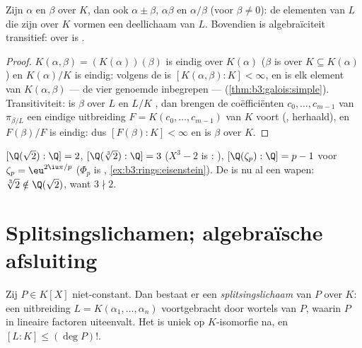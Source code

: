 \begin{corollary}\label{cor:b3:galois:algclosed}
Zijn $\alpha$ en $\beta$  over $K$, dan ook $\alpha \pm
\beta$, $\alpha\beta$ en $\alpha/\beta$ (voor $\beta \ne 0$): de
elementen van $L$ die  zijn over $K$ vormen een
deellichaam van $L$. Bovendien is algebraïciteit transitief:
 over  is .
\end{corollary}

\begin{proof}
$K(\alpha, \beta) = (K(\alpha))(\beta)$ is eindig over
$K(\alpha)$ ($\beta$ is  over $K \subseteq K(\alpha)$)
en $K(\alpha)/K$ is eindig: volgens de  is
$[K(\alpha,\beta):K] < \infty$, en is elk element van $K(\alpha,
\beta)$ --- de vier genoemde inbegrepen --- 
(\cref{thm:b3:galois:simple}). Transitiviteit: is $\beta$
 over $L$ en $L/K$ , dan brengen de
coëfficiënten $c_0, \dots, c_{m-1}$ van $\pi_{\beta/L}$ een
eindige uitbreiding $F = K(c_0, \dots, c_{m-1})$ van $K$ voort
(, herhaald), en $F(\beta)/F$ is eindig: dus
$[F(\beta):K] < \infty$ en is $\beta$  over $K$.
\end{proof}

\begin{example}\label{ex:b3:galois:degrees}
$[\Q(\sqrt2):\Q] = 2$, $[\Q(\sqrt[3]2):\Q] = 3$ ($X^3 - 2$ is
: ), $[\Q(\zeta_p):\Q] = p - 1$ voor
$\zeta_p = \eu^{2\iu\pi/p}$ ($\Phi_p$ is ,
\cref{ex:b3:rings:eisenstein}). De  is nu al een wapen:
$\sqrt[3]2 \notin \Q(\sqrt2)$, want $3 \nmid 2$.
\end{example}

\section{Splitsingslichamen; algebraïsche afsluiting}

\begin{theorem}[Splitsingslichamen]\label{thm:b3:galois:splitting}
Zij $P \in K[X]$ niet-constant. Dan bestaat er een
\emph{splitsingslichaam} van $P$ over
$K$: een uitbreiding $L = K(\alpha_1, \dots, \alpha_n)$
voortgebracht door wortels van $P$, waarin $P$ in lineaire
factoren uiteenvalt. Het is uniek op $K$-isomorfie na, en $[L:K]
\leq (\deg P)!$.
\end{theorem}

